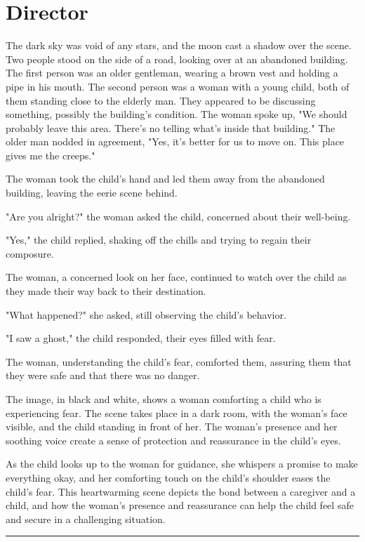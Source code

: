 \documentclass[smalldemyvopaper,11pt,twoside,onecolumn,openright,extrafontsizes]{memoir}
\begin{document}
\chapter{Director}
The dark sky was void of any stars, and the moon cast a shadow over the scene. Two people stood on the side of a road, looking over at an abandoned building. The first person was an older gentleman, wearing a brown vest and holding a pipe in his mouth. The second person was a woman with a young child, both of them standing close to the elderly man. They appeared to be discussing something, possibly the building's condition. The woman spoke up, "We should probably leave this area. There's no telling what's inside that building." The older man nodded in agreement, "Yes, it's better for us to move on. This place gives me the creeps."\par
The woman took the child's hand and led them away from the abandoned building, leaving the eerie scene behind.\par
"Are you alright?" the woman asked the child, concerned about their well-being.\par
"Yes," the child replied, shaking off the chills and trying to regain their composure.\par
The woman, a concerned look on her face, continued to watch over the child as they made their way back to their destination.\par
"What happened?" she asked, still observing the child's behavior.\par
"I saw a ghost," the child responded, their eyes filled with fear.\par
The woman, understanding the child's fear, comforted them, assuring them that they were safe and that there was no danger.\par
The image, in black and white, shows a woman comforting a child who is experiencing fear. The scene takes place in a dark room, with the woman's face visible, and the child standing in front of her. The woman's presence and her soothing voice create a sense of protection and reassurance in the child's eyes.\par
As the child looks up to the woman for guidance, she whispers a promise to make everything okay, and her comforting touch on the child's shoulder eases the child's fear. This heartwarming scene depicts the bond between a caregiver and a child, and how the woman's presence and reassurance can help the child feel safe and secure in a challenging situation.\par
\fancybreak{* * *}
\end{document}
